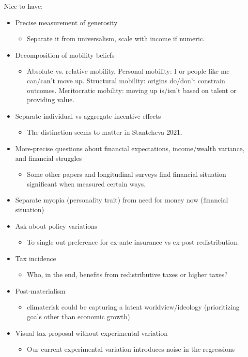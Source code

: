 \documentclass{article}
\begin{document}
Nice to have:
\begin{itemize}
    \item Precise measurement of generosity
    \begin{itemize}
        \item Separate it from universalism, scale with income if numeric.
    \end{itemize}
    \item Decomposition of mobility beliefs
    \begin{itemize}
        \item Absolute vs. relative mobility.  Personal mobility: I or people like me can/can't move up. Structural mobility: origins do/don't constrain outcomes. Meritocratic mobility: moving up is/isn't based on talent or providing value.
    \end{itemize}
    \item Separate individual vs aggregate incentive effects
    \begin{itemize}
        \item The distinction seems to matter in Stantcheva 2021.
    \end{itemize}
    \item More-precise questions about financial expectations, income/wealth variance, and financial struggles
    \begin{itemize}
        \item Some other papers and longitudinal surveys find financial situation significant when measured certain ways.
    \end{itemize}
    \item Separate myopia (personality trait) from need for money now (financial situation)
    \item Ask about policy variations
    \begin{itemize}
        \item To single out preference for ex-ante insurance vs ex-post redistribution. 
    \end{itemize}
    \item Tax incidence
    \begin{itemize}
        \item Who, in the end, benefits from redistributive taxes or higher taxes?
    \end{itemize}
    \item Post-materialism 
    \begin{itemize}
        \item climaterisk could be capturing a latent worldview/ideology (prioritizing goals other than economic growth)
    \end{itemize}
    \item Visual tax proposal without experimental variation
    \begin{itemize}
        \item Our current experimental variation introduces noise in the regressions
    \end{itemize}
\end{itemize}
\end{document}
